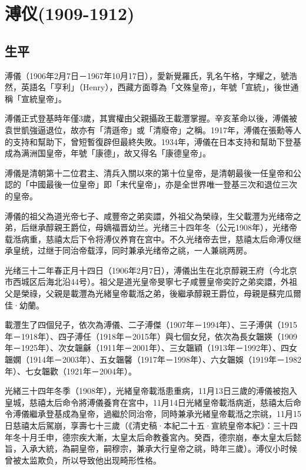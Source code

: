 
\section{溥仪\tiny(1909-1912)}

\subsection{生平}

溥儀（1906年2月7日－1967年10月17日），愛新覺羅氏，乳名午格，字耀之，號浩然，英語名「亨利」（Henry），西藏方面尊為「文殊皇帝」，年號「宣統」，後世通稱「宣統皇帝」。

溥儀正式登基時年僅3歲，其實權由父親攝政王載灃掌握。辛亥革命以後，溥儀被袁世凱強逼退位，故亦有「清遜帝」或「清廢帝」之稱。1917年，溥儀在張勳等人的支持和幫助下，曾短暫復辟但最終失敗。1934年，溥儀在日本支持和幫助下登基成為满洲国皇帝，年號「康德」，故又得名「康德皇帝」。

溥儀是清朝第十二位君主、清兵入關以來的第十位皇帝，是清朝最後一任皇帝和公認的「中國最後一位皇帝」即「末代皇帝」，亦是全世界唯一登基三次和退位三次的皇帝。

溥儀的祖父為道光帝七子、咸豐帝之弟奕譞，外祖父為榮祿，生父載灃为光绪帝之弟，后继承醇親王爵位，母嫡福晋幼兰。光绪三十四年冬（公元1908年），光绪帝载湉病重，慈禧太后下令将溥仪养育在宫中。不久光绪帝去世，慈禧太后命溥仪继承皇统，过继于同治帝载淳，同时兼承光绪帝之祧，一人兼祧两房。

光绪三十二年春正月十四日（1906年2月7日），溥儀出生在北京醇親王府（今北京市西城区后海北沿44号）。祖父是道光皇帝旻寧七子咸豐皇帝奕詝之弟奕譞，外祖父是榮祿，父親是載灃為光緒皇帝載湉之弟，後繼承醇親王爵位，母親是蘇完瓜爾佳·幼蘭。

載灃生了四個兒子，依次為溥儀、二子溥傑（1907年－1994年）、三子溥倛（1915年－1918年）、四子溥任（1918年－2015年）與七個女兒，依次為長女韞媖（1909年－1925年）、次女韞龢（1911年－2001年）、三女韞穎（1913年－1992年）、四女韞嫻（1914年－2003年）、五女韞馨（1917年－1998年）、六女韞娛（1919年－1982年）、七女韞歡（1921年－2004年）。

光緒三十四年冬季（1908年），光緒皇帝載湉患重病，11月13日三歲的溥儀被抱入皇城，慈禧太后命令將溥儀養育在宮中，11月14日光緒皇帝載湉病逝，慈禧太后命令溥儀繼承登基成為皇帝，過繼於同治帝，同時兼承光緒皇帝載湉之宗祧，11月15日慈禧太后駕崩，享壽七十三歲（《清史稿·本紀二十五·宣統皇帝本紀》：三十四年冬十月壬申，德宗疾大漸，太皇太后命教養宮內。癸酉，德宗崩，奉太皇太后懿旨，入承大統，為嗣皇帝，嗣穆宗，兼承大行皇帝之祧，時年三歲）。溥仪小时候曾被太监欺负，所以导致他出现畸形性格。

